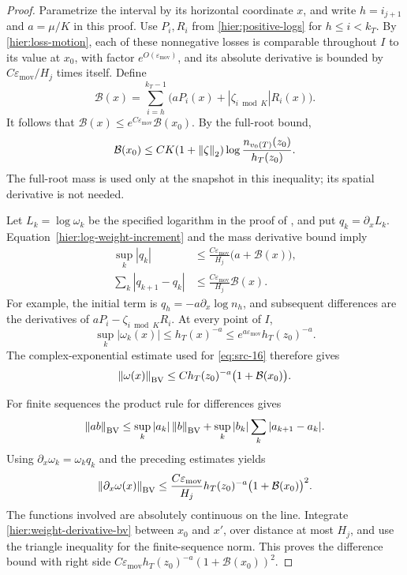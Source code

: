 \begin{proof}
Parametrize the interval by its horizontal coordinate $x$, and write
$h=i_{j+1}$ and $a=\mu/K$ in this proof.  Use $P_i,R_i$ from
\eqref{hier:positive-logs} for $h\le i<k_T$.  By
\eqref{hier:loss-motion}, each of these nonnegative losses is comparable
throughout $I$ to its value at $x_0$, with factor
$e^{O(\varepsilon_{\mathrm{mov}})}$, and its absolute derivative is bounded by
$C\varepsilon_{\mathrm{mov}}/H_j$ times itself.  Define
\[
 \mathcal B(x)=\sum_{i=h}^{k_T-1}
                    \bigl(aP_i(x)+|\zeta_{i\bmod K}|R_i(x)\bigr).
\]
It follows that $\mathcal B(x)\le e^{C\varepsilon_{\mathrm{mov}}}\mathcal B(x_0)$.
By the full-root bound,
\begin{equation}
 \mathcal B(x_0)
 \le C K(1+\left\|\zeta\right\|_2)
                 \log\frac{n_{v_0(T)}(z_0)}{h_T(z_0)}.
 \label{hier:moving-loss-budget}
\end{equation}
The full-root mass is used only at the snapshot in this inequality; its
spatial derivative is not needed.

Let $L_k=\log\omega_k$ be the specified logarithm in the proof of
, and put $q_k=\partial_x L_k$.
Equation~\eqref{hier:log-weight-increment} and the mass derivative
bound imply
\begin{align*}
 \sup_k|q_k|
 &\le\frac{C\varepsilon_{\mathrm{mov}}}{H_j}
                  \bigl(a+\mathcal B(x)\bigr),\\
 \sum_k|q_{k+1}-q_k|
 &\le\frac{C\varepsilon_{\mathrm{mov}}}{H_j}\mathcal B(x).
\end{align*}
For example, the initial term is
$q_h=-a\partial_x\log n_h$, and subsequent differences are the
derivatives of $aP_i-\zeta_{i\bmod K}R_i$.  At every point of $I$,
\[
 \sup_k|\omega_k(x)|\le h_T(x)^{-a}
 \le e^{a\varepsilon_{\mathrm{mov}}}h_T(z_0)^{-a}.
\]
The complex-exponential estimate used for
\eqref{eq:src-16} therefore gives
\[
 \left\|\omega(x)\right\|_{\mathrm{BV}}
 \le C h_T(z_0)^{-a}\bigl(1+\mathcal B(x_0)\bigr).
\]

For finite sequences the product rule for differences gives
\[
 \left\|ab\right\|_{\mathrm{BV}}
 \le \sup_k|a_k|\left\|b\right\|_{\mathrm{BV}}
       +\sup_k|b_k|\sum_k|a_{k+1}-a_k|.
\]
Using $\partial_x\omega_k=\omega_k q_k$ and the preceding estimates
yields
\begin{equation}
 \left\|\partial_x\omega(x)\right\|_{\mathrm{BV}}
 \le\frac{C\varepsilon_{\mathrm{mov}}}{H_j}
 h_T(z_0)^{-a}\bigl(1+\mathcal B(x_0)\bigr)^2.
 \label{hier:weight-derivative-bv}
\end{equation}
The functions involved are absolutely continuous on the line.  Integrate
\eqref{hier:weight-derivative-bv} between $x_0$ and $x'$, over distance
at most $H_j$, and use the triangle inequality for the finite-sequence
norm.  This proves the difference bound with right side
$C\varepsilon_{\mathrm{mov}} h_T(z_0)^{-a}(1+\mathcal B(x_0))^2$.


\end{proof}
